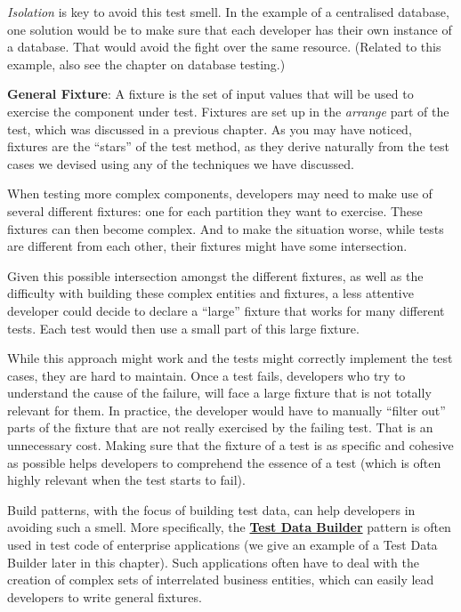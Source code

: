 \emph{Isolation} is key to avoid this test smell. In the example of a
centralised database, one solution would be to make sure that each
developer has their own instance of a database. That would avoid the
fight over the same resource. (Related to this example, also see the
chapter on database testing.)

\textbf{General Fixture}: A fixture is the set of input values that will
be used to exercise the component under test. Fixtures are set up in the
\emph{arrange} part of the test, which was discussed in a previous
chapter. As you may have noticed, fixtures are the ``stars'' of the test
method, as they derive naturally from the test cases we devised using
any of the techniques we have discussed.

When testing more complex components, developers may need to make use of
several different fixtures: one for each partition they want to
exercise. These fixtures can then become complex. And to make the
situation worse, while tests are different from each other, their
fixtures might have some intersection.

Given this possible intersection amongst the different fixtures, as well
as the difficulty with building these complex entities and fixtures, a
less attentive developer could decide to declare a ``large'' fixture
that works for many different tests. Each test would then use a small
part of this large fixture.

While this approach might work and the tests might correctly implement
the test cases, they are hard to maintain. Once a test fails, developers
who try to understand the cause of the failure, will face a large
fixture that is not totally relevant for them. In practice, the
developer would have to manually ``filter out'' parts of the fixture
that are not really exercised by the failing test. That is an
unnecessary cost. Making sure that the fixture of a test is as specific
and cohesive as possible helps developers to comprehend the essence of a
test (which is often highly relevant when the test starts to fail).

Build patterns, with the focus of building test data, can help
developers in avoiding such a smell. More specifically, the
\textbf{\href{http://www.natpryce.com/articles/000714.html}{Test Data
Builder}} pattern is often used in test code of enterprise applications
(we give an example of a Test Data Builder later in this chapter). Such
applications often have to deal with the creation of complex sets of
interrelated business entities, which can easily lead developers to
write general fixtures.

